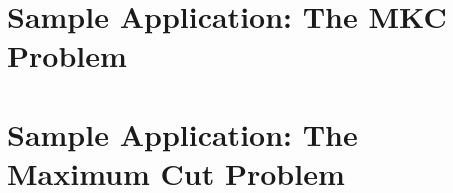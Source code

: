 \documentclass[openany,twoside,11pt]{book}
\newcommand{\BB}{{\sc COIN/BCP}}
\begin{document}
%

\chapter{Sample Application: The MKC Problem}
\label{sample-mkc}


\chapter{Sample Application: The Maximum Cut Problem}
\label{sample-mcp}



%



\end{document}
